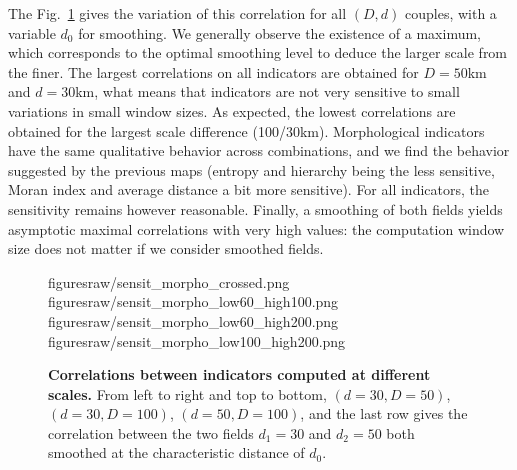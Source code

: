 The Fig.~\ref{fig:app:staticcorrelations:sensitivity-corrs} gives the variation of this correlation for all $(D,d)$ couples, with a variable $d_0$ for smoothing. We generally observe the existence of a maximum, which corresponds to the optimal smoothing level to deduce the larger scale from the finer. The largest correlations on all indicators are obtained for $D=50$km and $d=30$km, what means that indicators are not very sensitive to small variations in small window sizes. As expected, the lowest correlations are obtained for the largest scale difference (100/30km). Morphological indicators have the same qualitative behavior across combinations, and we find the behavior suggested by the previous maps (entropy and hierarchy being the less sensitive, Moran index and average distance a bit more sensitive). For all indicators, the sensitivity remains however reasonable. Finally, a smoothing of both fields yields asymptotic maximal correlations with very high values: the computation window size does not matter if we consider smoothed fields.



\begin{figure}
	figuresraw/sensit_morpho_crossed.png
	figuresraw/sensit_morpho_low60_high100.png
	figuresraw/sensit_morpho_low60_high200.png
	figuresraw/sensit_morpho_low100_high200.png
	\caption{\textbf{Correlations between indicators computed at different scales.} From left to right and top to bottom, $(d=30,D=50)$, $(d=30,D=100)$, $(d=50,D=100)$, and the last row gives the correlation between the two fields $d_1=30$ and $d_2=50$ both smoothed at the characteristic distance of $d_0$.\label{fig:app:staticcorrelations:sensitivity-corrs}}
\end{figure}







